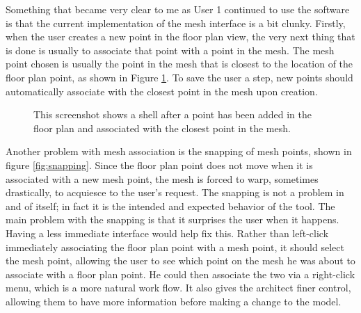 \documentclass{thesis}
\begin{document}
Something that became very clear to me as User 1 continued to use the software is that the current implementation of the mesh
interface is a bit clunky.  Firstly, when the user creates a new point in the floor plan view, the very next thing that is done is
usually to associate that point with a point in the mesh.  The mesh point chosen is usually the point in the mesh that is closest
to the location of the floor plan point, as shown in Figure \ref{fig:closest_point}.  To save the user a step, new points
should automatically associate with the closest point in the mesh upon creation.

\begin{figure}
\caption[Association with the closest point]{This screenshot shows a shell after a point has been added in the floor plan and
associated with the closest point in the mesh.}
\label{fig:closest_point}
\end{figure}

Another problem with mesh association is the snapping of mesh points, shown in figure \ref{fig:snapping}.  Since the floor plan
point does not move when it is associated with a new mesh point, the mesh is forced to warp, sometimes drastically, to acquiesce
to the user's request.  The snapping is not a problem in and of itself; in fact it is the intended and expected behavior of the
tool.  The main problem with the snapping is that it surprises the user when it happens.  Having a less immediate interface would
help fix this.  Rather than left-click immediately associating the floor plan point with a mesh point, it should select the mesh
point, allowing the user to see which point on the mesh he was about to associate with a floor plan point.  He could then
associate the two via a right-click menu, which is a more natural work flow.  It also gives the architect finer control, allowing
them to have more information before making a change to the model.
\end{document}
